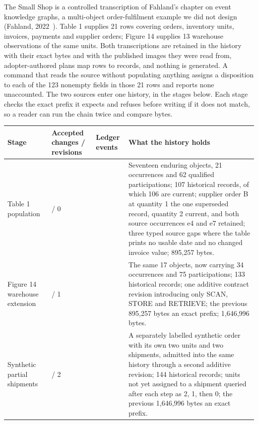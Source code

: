 \par\medskip
\noindent\begin{minipage}{\linewidth}
The Small Shop is a controlled transcription of Fahland's chapter on event knowledge graphs, a multi-object order-fulfilment example we did not design (Fahland, 2022~\cite{fahland2022ekg}). Table 1 supplies 21 rows covering orders, inventory units, invoices, payments and supplier orders; Figure 14 supplies 13 warehouse observations of the same units. Both transcriptions are retained in the history with their exact bytes and with the published images they were read from, adopter-authored plans map rows to records, and nothing is generated. A command that reads the source without populating anything assigns a disposition to each of the 123 nonempty fields in those 21 rows and reports none unaccounted. The two sources enter one history, in the stages below. Each stage checks the exact prefix it expects and refuses before writing if it does not match, so a reader can run the chain twice and compare bytes.

{\scriptsize\setlength{\tabcolsep}{3pt}\renewcommand{\arraystretch}{1.3}
\begin{tabular}{>{\raggedright\arraybackslash}p{}>{\raggedright\arraybackslash}p{}>{\raggedright\arraybackslash}p{}>{\raggedright\arraybackslash}p{}}
\toprule
\textbf{Stage} & \textbf{Accepted changes / revisions} & \textbf{Ledger events} & \textbf{What the history holds} \\
\midrule
Table 1 population & 21 / 0 & 121 & Seventeen enduring objects, 21 occurrences and 62 qualified participations; 107 historical records, of which 106 are current; supplier order B at quantity 1 the one superseded record, quantity 2 current, and both source occurrences e4 and e7 retained; three typed source gaps where the table prints no usable date and no changed invoice value; 895,257 bytes. \\
Figure 14 warehouse extension & 34 / 1 & 193 & The same 17 objects, now carrying 34 occurrences and 75 participations; 133 historical records; one additive contract revision introducing only SCAN, STORE and RETRIEVE; the previous 895,257 bytes an exact prefix; 1,646,996 bytes. \\
Synthetic partial shipments & 37 / 2 & 216 & A separately labelled synthetic order with its own two units and two shipments, admitted into the same history through a second additive revision; 144 historical records; units not yet assigned to a shipment queried after each step as 2, 1, then 0; the previous 1,646,996 bytes an exact prefix. \\
\bottomrule
\end{tabular}}
\end{minipage}\par\medskip

